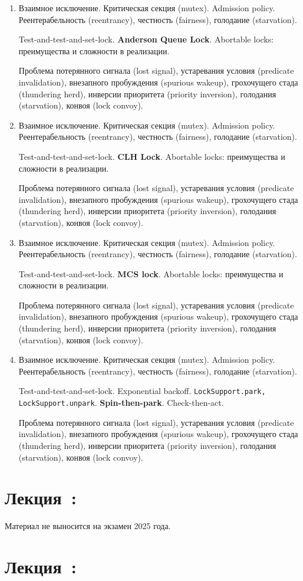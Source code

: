 \documentclass[a4paper, 12pt]{extarticle}
\newcommand{\mutexBasics}{Взаимное исключение. Критическая секция (mutex). Admission policy. Реентерабельность (reentrancy), честность (fairness), голодание (starvation).}
\newcommand{\commonProblems}{Проблема потерянного сигнала (lost signal), устаревания условия (predicate invalidation), внезапного пробуждения (spurious wakeup), грохочущего стада (thundering herd),
инверсии приоритета (priority inversion), голодания (starvation), конвоя (lock convoy). }
\begin{document}
\begin{enumerate}[\thesection .1]
	
	\item \mutexBasics

	\globMemOverview

	Test-and-test-and-set-lock. \textbf{Anderson Queue Lock}. Abortable locks: преимущества и сложности в реализации.

	\commonProblems		

	\item \mutexBasics

	\globMemOverview

	Test-and-test-and-set-lock. \textbf{CLH Lock}. Abortable locks: преимущества и сложности в реализации.

	\commonProblems		


	\item \mutexBasics

	\globMemOverview

	Test-and-test-and-set-lock. \textbf{MCS lock}. Abortable locks: преимущества и сложности в реализации.

	\commonProblems		

	\item \mutexBasics

	\globMemOverview

	Test-and-test-and-set-lock. Exponential backoff. \texttt{LockSupport.park, LockSupport.unpark}. \textbf{Spin-then-park}. Check-then-act.

	\commonProblems		
\end{enumerate}


\section{Лекция~\userSpaceThreadingNum: \userSpaceThreadingTopic}

Материал не выносится на экзамен 2025 года.

% 

\section{Лекция~\concurrentQueuesNum: \concurrentQueuesNumTopic}
\end{document}
